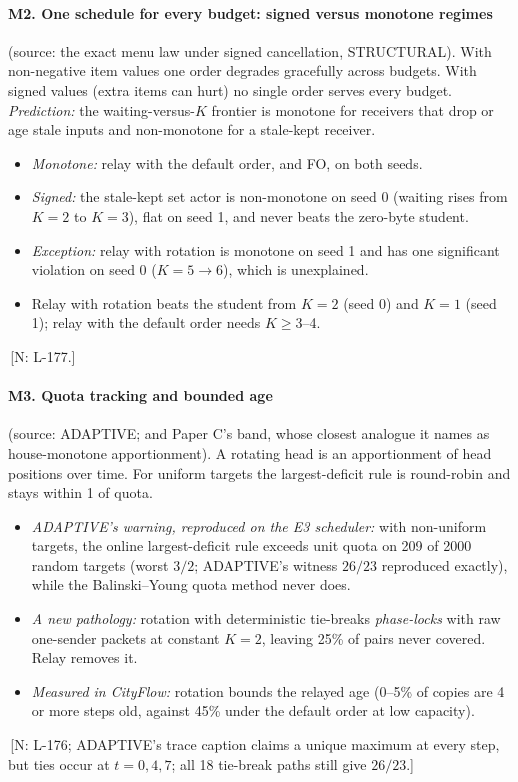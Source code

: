 \documentclass[11pt]{article}
\theoremstyle{definition}
\newif\ifshownotes\shownotestrue
\newcommand{\NOTE}[1]{\ifshownotes{\color{notecol}\,\textsf{\footnotesize[N: #1]}}\fi}
\begin{document}
\paragraph{M2. One schedule for every budget: signed versus monotone regimes} (source: the exact menu law under signed
cancellation, STRUCTURAL). With non-negative item values one order degrades gracefully across budgets. With signed values
(extra items can hurt) no single order serves every budget. \emph{Prediction:} the waiting-versus-$K$ frontier is
monotone for receivers that drop or age stale inputs and non-monotone for a stale-kept receiver.
\begin{itemize}
\item \emph{Monotone:} relay with the default order, and FO, on both seeds.
\item \emph{Signed:} the stale-kept set actor is non-monotone on seed 0 (waiting rises from $K=2$ to $K=3$), flat on seed
1, and never beats the zero-byte student.
\item \emph{Exception:} relay with rotation is monotone on seed 1 and has one significant violation on seed 0 ($K=5\to6$),
which is unexplained.
\item Relay with rotation beats the student from $K=2$ (seed 0) and $K=1$ (seed 1); relay with the default order needs
$K\ge3$--4.
\end{itemize}
\NOTE{L-177.}

\paragraph{M3. Quota tracking and bounded age} (source: ADAPTIVE; and Paper C's band, whose closest analogue it names as
house-monotone apportionment). A rotating head is an apportionment of head positions over time. For uniform targets the
largest-deficit rule is round-robin and stays within 1 of quota.
\begin{itemize}
\item \emph{ADAPTIVE's warning, reproduced on the E3 scheduler:} with non-uniform targets, the online largest-deficit rule
exceeds unit quota on 209 of 2000 random targets (worst $3/2$; ADAPTIVE's witness $26/23$ reproduced exactly), while
the Balinski--Young quota method never does.
\item \emph{A new pathology:} rotation with deterministic tie-breaks \emph{phase-locks} with raw one-sender packets at
constant $K=2$, leaving 25\% of pairs never covered. Relay removes it.
\item \emph{Measured in CityFlow:} rotation bounds the relayed age (0--5\% of copies are 4 or more steps old, against
45\% under the default order at low capacity).
\end{itemize}
\NOTE{L-176; ADAPTIVE's trace caption claims a unique maximum at every step, but ties occur at $t=0,4,7$; all 18
tie-break paths still give $26/23$.}
\end{document}
